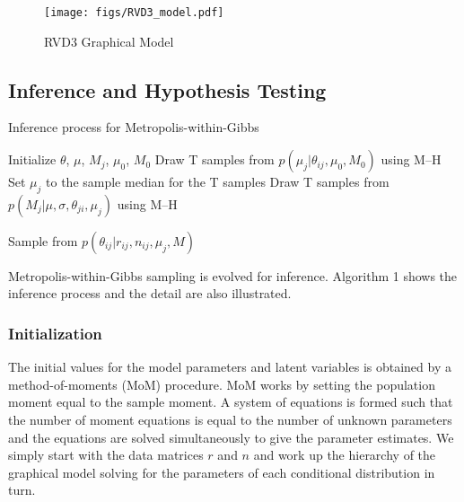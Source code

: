 \documentclass[11pt,reqno]{amsart}
\begin{document}
\begin{figure}[h]
\begin{center}
\texttt{[image: figs/RVD3\_model.pdf]}
\caption{RVD3 Graphical Model}
\label{fig:graphical_model}
\end{center}
\end{figure}


\subsection{Inference and Hypothesis Testing}

\begin{algorithm}[ht]
\caption{Inference process for Metropolis-within-Gibbs}
\label{alg:metro_gibbs}
\begin{algorithmic}[1]

\State Initialize $\theta$, $\mu$, $M_j$, $\mu_0$, $M_0$
\Repeat
{}
  \State Draw T samples from $p \left( \mu_j |\theta_{ij},\mu_0,M_0\right)$ using M--H 
  \State Set $\mu_j$ to the sample median for the T samples
  \State Draw T samples from $p \left( M_{j} |\mu,\sigma, \theta_{ji},\mu_j\right)$ using M--H 

	\State Sample from $p \left( \theta_{ij} |r_{ij},n_{ij},\mu_j,M \right)$  
  \EndFor

\EndFor
{}
\end{algorithmic}
\end{algorithm}

Metropolis-within-Gibbs sampling is evolved for inference. Algorithm 1 shows the inference process and the detail are also illustrated.

\subsubsection{Initialization}
The initial values for the model parameters and latent variables is obtained by a method-of-moments (MoM) procedure. MoM works by setting the population moment equal to the sample moment. A system of equations is formed such that the number of moment equations is equal to the number of unknown parameters and the equations are solved simultaneously to give the parameter estimates. We simply start with the data matrices $r$ and $n$ and work up the hierarchy of the graphical model solving for the parameters of each conditional distribution in turn.
\end{document}

